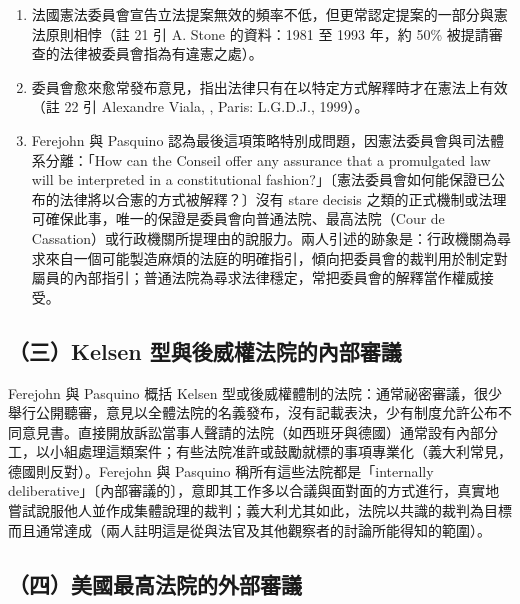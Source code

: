 \begin{enumerate}
\def\labelenumi{\arabic{enumi}.}
\tightlist
\item
  法國憲法委員會宣告立法提案無效的頻率不低，但更常認定提案的一部分與憲法原則相悖（註 21 引 A. Stone 的資料：1981 至 1993 年，約 50\% 被提請審查的法律被委員會指為有違憲之處）。
\item
  委員會愈來愈常發布意見，指出法律只有在以特定方式解釋時才在憲法上有效（註 22 引 Alexandre Viala, , Paris: L.G.D.J., 1999）。
\item
  Ferejohn 與 Pasquino 認為最後這項策略特別成問題，因憲法委員會與司法體系分離：「How can the Conseil offer any assurance that a promulgated law will be interpreted in a constitutional fashion?」〔憲法委員會如何能保證已公布的法律將以合憲的方式被解釋？〕沒有 stare decisis 之類的正式機制或法理可確保此事，唯一的保證是委員會向普通法院、最高法院（Cour de Cassation）或行政機關所提理由的說服力。兩人引述的跡象是：行政機關為尋求來自一個可能製造麻煩的法庭的明確指引，傾向把委員會的裁判用於制定對屬員的內部指引；普通法院為尋求法律穩定，常把委員會的解釋當作權威接受。
\end{enumerate}

\subsection{（三）Kelsen 型與後威權法院的內部審議}

Ferejohn 與 Pasquino 概括 Kelsen 型或後威權體制的法院：通常祕密審議，很少舉行公開聽審，意見以全體法院的名義發布，沒有記載表決，少有制度允許公布不同意見書。直接開放訴訟當事人聲請的法院（如西班牙與德國）通常設有內部分工，以小組處理這類案件；有些法院准許或鼓勵就標的事項專業化（義大利常見，德國則反對）。Ferejohn 與 Pasquino 稱所有這些法院都是「internally deliberative」〔內部審議的〕，意即其工作多以合議與面對面的方式進行，真實地嘗試說服他人並作成集體說理的裁判；義大利尤其如此，法院以共識的裁判為目標而且通常達成（兩人註明這是從與法官及其他觀察者的討論所能得知的範圍）。

\subsection{（四）美國最高法院的外部審議}

